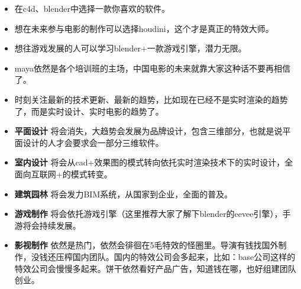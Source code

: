\documentclass[]{article}
\begin{document}
\begin{itemize}
\item
  在c4d、blender中选择一款你喜欢的软件。
\item
  想在未来参与电影的制作可以选择houdini，这个才是真正的特效大师。
\item
  想往游戏发展的人可以学习blender+一款游戏引擎，潜力无限。
\item
  maya依然是各个培训班的主场，中国电影的未来就靠大家这种话不要再相信了。
\item
  时刻关注最新的技术更新、最新的趋势，比如现在已经不是实时渲染的趋势了，而是实时设计、实时电影的趋势了。
\item
  \textbf{平面设计
  }将会消失，大趋势会发展为品牌设计，包含三维部分，也就是说平面设计的人才会要求会一部分三维软件。
\item
  \textbf{室内设计
  }将会从cad+效果图的模式转向依托实时渲染技术下的实时设计，全面向互联网+的模式转变。
\item
  \textbf{建筑园林 }将会发力BIM系统，从国家到企业，全面的普及。
\item
  \textbf{游戏制作
  }将会依托游戏引擎（这里推荐大家了解下blender的eevee引擎），手游将会持续发展。
\item
  \textbf{影视制作
  }依然是热门，依然会徘徊在5毛特效的怪圈里。导演有钱找国外制作，没钱还压榨国内团队。国内的特效公司会多起来，比如：base公司这样的特效公司会慢慢多起来。饼干依然看好产品广告，知道钱在哪，也好组建团队创业。
\end{itemize}
\end{document}
